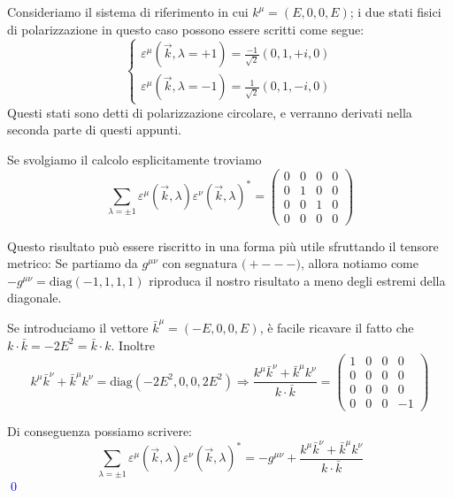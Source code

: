 \documentclass[../main.tex]{subfiles}
\begin{document}
Consideriamo il sistema di riferimento in cui \(k^\mu = (E,0,0,E)\); i due stati fisici di polarizzazione in questo caso possono essere scritti come segue:
\[
\begin{cases}
    \varepsilon^\mu(\Vec{k}, \lambda = +1) = \frac{-1}{\sqrt{2}}(0,1,+i,0)\\
    \varepsilon^\mu(\Vec{k}, \lambda = -1) = \frac{1}{\sqrt{2}}(0,1,-i,0)
\end{cases}
\]
Questi stati sono detti di polarizzazione circolare, e verranno derivati nella seconda parte di questi appunti.

Se svolgiamo il calcolo esplicitamente troviamo
\[
\sum_{\lambda=\pm1} \varepsilon^\mu(\Vec{k}, \lambda)\varepsilon^\nu(\Vec{k}, \lambda)^\ast = 
\begin{pmatrix}
    0   &   0   &   0   &   0    \\
    0   &   1   &   0   &   0    \\
    0   &   0   &   1   &   0    \\
    0   &   0   &   0   &   0    
\end{pmatrix}
\]

Questo risultato può essere riscritto in una forma più utile sfruttando il tensore metrico: Se partiamo da \(g^{\mu\nu}\) con segnatura \(\big(+---\big)\), allora notiamo come \(\boxed{-g^{\mu\nu} = \text{diag}(-1,1,1,1)}\) riproduca il nostro risultato a meno degli estremi della diagonale.

Se introduciamo il vettore \(\bar k^\mu = (-E,0,0,E)\), è facile ricavare il fatto che \( k\cdot\bar k = -2E^2 = \bar k\cdot k\). Inoltre 
\[
k^\mu \bar k^\nu + \bar k^\mu k^\nu = \text{diag}(-2E^2,0,0,2E^2) \Rightarrow
\boxed{
\frac{k^\mu \bar k^\nu + \bar k^\mu k^\nu}{k\cdot\bar k} =
\begin{pmatrix}
    1   &   0   &   0   &   0    \\
    0   &   0   &   0   &   0    \\
    0   &   0   &   0   &   0    \\
    0   &   0   &   0   &   -1    
\end{pmatrix}}
\]

Di conseguenza possiamo scrivere:
\begin{equation}
    \sum_{\lambda=\pm1} \varepsilon^\mu(\Vec{k}, \lambda)\varepsilon^\nu(\Vec{k}, \lambda)^\ast = -g^{\mu\nu} + \frac{k^\mu \bar k^\nu + \bar k^\mu k^\nu}{k\cdot\bar k}
    \label{eq:polsum_final}
\end{equation} \textcolor{blue}{\qed}
\end{document}
